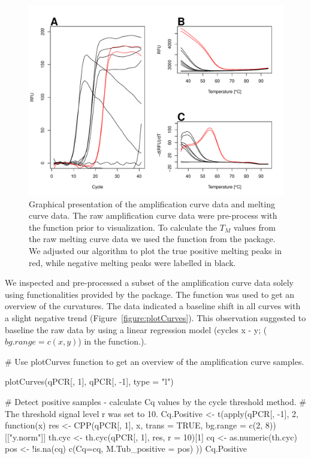 \begin{figure}[htbp]
  \centering
  \includegraphics[clip=true, width=14cm]{figures/amp_melt.pdf}
  \caption{Graphical presentation of the amplification curve data and melting 
curve data.  The raw amplification curve data were pre-process with 
the  function prior to visualization. To calculate the $T_{M}$ values 
from the raw melting curve data  we used the  function 
from the  package.  We adjusted our algorithm to 
plot the true positive melting peaks in red, while negative melting peaks were 
labelled in black.} 
\label{figure:amp_melt}
\end{figure}

We inspected and pre-processed a subset of the amplification curve data solely 
using functionalities provided by the  package. The 
 function was used to get an overview of the curvatures. The 
data indicated a baseline shift in all curves with a slight negative trend 
(Figure~\ref{figure:plotCurves}). This observation suggested to baseline the raw data by 
using a linear regression model (cycles x - y; ($bg.range = c(x, y)$) in the 
 function.).

\begin{example}
# Use plotCurves function to get an overview of the amplification curve samples.

plotCurves(qPCR[, 1], qPCR[, -1], type = "l")

# Detect positive samples - calculate Cq values by the cycle threshold method. 
# The threshold signal level r was set to 10.
Cq.Positive <- t(apply(qPCR[, -1], 2, function(x)
{
  res <- CPP(qPCR[, 1], x, trans = TRUE, bg.range = c(2, 8))[["y.norm"]]
  th.cyc <- th.cyc(qPCR[, 1], res, r = 10)[1]
  cq <- as.numeric(th.cyc)
  pos <- !is.na(cq)
  c(Cq=cq, M.Tub_positive = pos)
}
))
Cq.Positive
\end{example}

